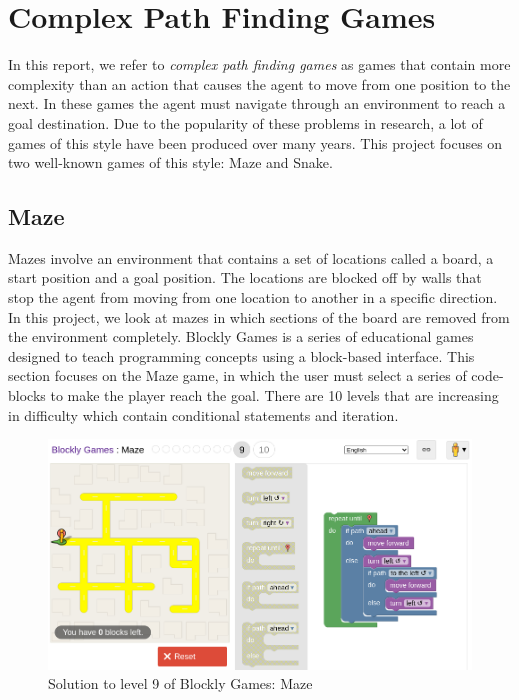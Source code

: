 \section{Complex Path Finding Games}
In this report, we refer to \textit{complex path finding games} as games that contain more complexity than an action that causes the agent to move from one position to the next. In these games the agent must navigate through an environment to reach a goal destination. Due to the popularity of these problems in research, a lot of games of this style have been produced over many years. This project focuses on two well-known games of this style: Maze and Snake.

\subsection{Maze}
Mazes involve an environment that contains a set of locations called a board, a start position and a goal position. The locations are blocked off by walls that stop the agent from moving from one location to another in a specific direction. In this project, we look at mazes in which sections of the board are removed from the environment completely. Blockly Games is a series of educational games designed to teach programming concepts using a block-based interface. This section focuses on the Maze game, in which the user must select a series of code-blocks to make the player reach the goal. There are 10 levels that are increasing in difficulty which contain conditional statements and iteration.

\begin{figure}[h!]
\centering
\includegraphics[width=\textwidth]{images/blockly_maze.png}
\caption{Solution to level 9 of Blockly Games: Maze}
\end{figure}

